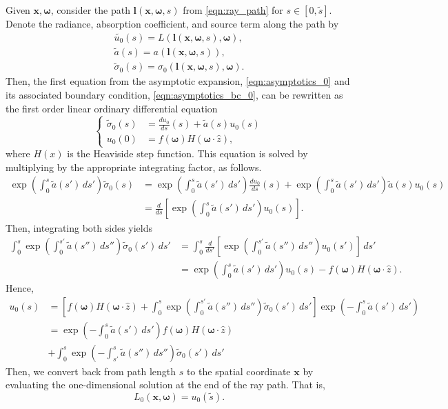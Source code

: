 \documentclass[ms,cpyr,lof,lot]{uathesis}
\renewcommand\vec\bm
\begin{document}
Given $\vec{x}, \vec{\omega}$, consider the path $\vec{l}(\vec{x}, \vec{\omega}, s)$ from \eqref{eqn:ray_path} for $s \in [0, \tilde{s}]$.
Denote the radiance, absorption coefficient, and source term along the path by
\begin{align*}
  \tilde{u_0}(s) = L(\vec{l}(\vec{x}, \vec{\omega}, s), \vec{\omega}), \\
  \tilde{a}(s) = a(\vec{l}(\vec{x}, \vec{\omega}, s)), \\
  \tilde\sigma_0(s) = \sigma_0(\vec{l}(\vec{x}, \vec{\omega}, s), \vec{\omega}).
\end{align*}
Then, the first equation from the asymptotic expansion, \eqref{eqn:asymptotics_0} and its associated boundary condition, \eqref{eqn:asymptotics_bc_0}, can be rewritten as the first order linear ordinary differential equation
\begin{equation}
  \left\{
  \begin{aligned}
  \tilde\sigma_0(s) &= \frac{du_0}{ds}(s) + \tilde{a}(s) u_0(s) \\
  u_0(0) &= f(\vec{\omega})H(\vec{\omega}\cdot\hat{z}),
  \end{aligned}
  \right.
  \label{eqn:asymptotics_ode_0}
\end{equation}
where $H(x)$ is the Heaviside step function.
This equation is solved by multiplying by the appropriate integrating factor, as follows.
\begin{align*}
  \exp\left(\int_0^s \tilde{a}(s')\, ds'\right)\tilde\sigma_0(s) &= \exp\left(\int_0^s \tilde{a}(s')\, ds'\right) \frac{du_0}{ds}(s) + \exp\left(\int_0^s \tilde{a}(s')\, ds'\right) \tilde{a}(s) u_0(s) \\
  &= \frac{d}{ds}\left[\exp\left(\int_0^s \tilde{a}(s')\, ds'\right) u_0(s)\right].
\end{align*}
Then, integrating both sides yields
\begin{align*}
  \int_0^s \exp\left(\int_0^{s'} \tilde{a}(s'')\, ds''\right)\tilde\sigma_0(s')\, ds' &= \int_0^s \frac{d}{ds'}\left[\exp\left(\int_0^{s'} \tilde{a}(s'')\, ds''\right) u_0(s')\right]\, ds' \\
  &= \exp\left(\int_0^s \tilde{a}(s')\, ds'\right) u_0(s) - f(\vec{\omega})H(\vec{\omega}\cdot\hat{z}).
\end{align*}
Hence,
\begin{align}
  u_0(s) &= \left[f(\vec{\omega})H(\vec{\omega}\cdot\hat{z}) + \int_0^s \exp\left(\int_0^{s'} \tilde{a}(s'')\, ds''\right) \tilde\sigma_0(s')\, ds'\right] \exp\left(-\int_0^s \tilde{a}(s')\, ds'\right) \nonumber\\
  &= \exp\left(-\int_0^s \tilde{a}(s')\, ds'\right) f(\vec{\omega})H(\vec{\omega}\cdot\hat{z}) \nonumber\\
    &+ \int_0^s \exp\left(-\int_{s'}^s \tilde{a}(s'')\, ds''\right) \tilde\sigma_0(s')\, ds'
  \label{eqn:asymptotics_soln_0}
\end{align}
Then, we convert back from path length $s$ to the spatial coordinate $\vec{x}$ by evaluating the one-dimensional solution at the end of the ray path.
That is,
\begin{equation*}
  L_0(\vec{x}, \vec{\omega}) = u_0(\tilde{s}).
\end{equation*}
\end{document}
